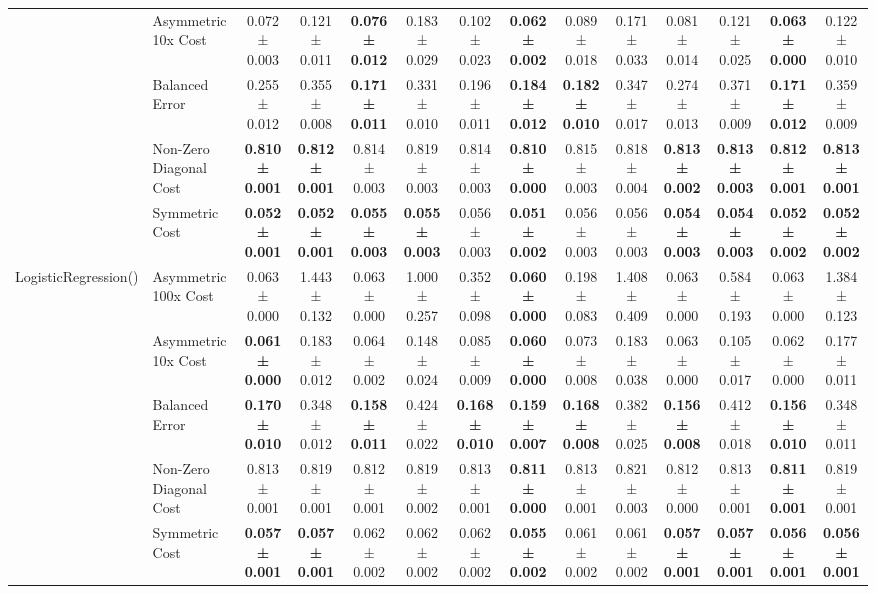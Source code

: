 \begin{table}[H]
{\begin{tabular}{llcccccccccccc}
 & Asymmetric 10x Cost & 0.072 ± 0.003 & 0.121 ± 0.011 & \textbf{0.076 ± 0.012} & 0.183 ± 0.029 & 0.102 ± 0.023 & \textbf{0.062 ± 0.002} & 0.089 ± 0.018 & 0.171 ± 0.033 & 0.081 ± 0.014 & 0.121 ± 0.025 & \textbf{0.063 ± 0.000} & 0.122 ± 0.010 \\
 & Balanced Error & 0.255 ± 0.012 & 0.355 ± 0.008 & \textbf{0.171 ± 0.011} & 0.331 ± 0.010 & 0.196 ± 0.011 & \textbf{0.184 ± 0.012} & \textbf{0.182 ± 0.010} & 0.347 ± 0.017 & 0.274 ± 0.013 & 0.371 ± 0.009 & \textbf{0.171 ± 0.012} & 0.359 ± 0.009 \\
 & Non-Zero Diagonal Cost & \textbf{0.810 ± 0.001} & \textbf{0.812 ± 0.001} & 0.814 ± 0.003 & 0.819 ± 0.003 & 0.814 ± 0.003 & \textbf{0.810 ± 0.000} & 0.815 ± 0.003 & 0.818 ± 0.004 & \textbf{0.813 ± 0.002} & \textbf{0.813 ± 0.003} & \textbf{0.812 ± 0.001} & \textbf{0.813 ± 0.001} \\
 & Symmetric Cost & \textbf{0.052 ± 0.001} & \textbf{0.052 ± 0.001} & \textbf{0.055 ± 0.003} & \textbf{0.055 ± 0.003} & 0.056 ± 0.003 & \textbf{0.051 ± 0.002} & 0.056 ± 0.003 & 0.056 ± 0.003 & \textbf{0.054 ± 0.003} & \textbf{0.054 ± 0.003} & \textbf{0.052 ± 0.002} & \textbf{0.052 ± 0.002} \\
\cline{1-14}
\multirow[t]{5}{*}{LogisticRegression()} & Asymmetric 100x Cost & 0.063 ± 0.000 & 1.443 ± 0.132 & 0.063 ± 0.000 & 1.000 ± 0.257 & 0.352 ± 0.098 & \textbf{0.060 ± 0.000} & 0.198 ± 0.083 & 1.408 ± 0.409 & 0.063 ± 0.000 & 0.584 ± 0.193 & 0.063 ± 0.000 & 1.384 ± 0.123 \\
 & Asymmetric 10x Cost & \textbf{0.061 ± 0.000} & 0.183 ± 0.012 & 0.064 ± 0.002 & 0.148 ± 0.024 & 0.085 ± 0.009 & \textbf{0.060 ± 0.000} & 0.073 ± 0.008 & 0.183 ± 0.038 & 0.063 ± 0.000 & 0.105 ± 0.017 & 0.062 ± 0.000 & 0.177 ± 0.011 \\
 & Balanced Error & \textbf{0.170 ± 0.010} & 0.348 ± 0.012 & \textbf{0.158 ± 0.011} & 0.424 ± 0.022 & \textbf{0.168 ± 0.010} & \textbf{0.159 ± 0.007} & \textbf{0.168 ± 0.008} & 0.382 ± 0.025 & \textbf{0.156 ± 0.008} & 0.412 ± 0.018 & \textbf{0.156 ± 0.010} & 0.348 ± 0.011 \\
 & Non-Zero Diagonal Cost & 0.813 ± 0.001 & 0.819 ± 0.001 & 0.812 ± 0.001 & 0.819 ± 0.002 & 0.813 ± 0.001 & \textbf{0.811 ± 0.000} & 0.813 ± 0.001 & 0.821 ± 0.003 & 0.812 ± 0.000 & 0.813 ± 0.001 & \textbf{0.811 ± 0.001} & 0.819 ± 0.001 \\
 & Symmetric Cost & \textbf{0.057 ± 0.001} & \textbf{0.057 ± 0.001} & 0.062 ± 0.002 & 0.062 ± 0.002 & 0.062 ± 0.002 & \textbf{0.055 ± 0.002} & 0.061 ± 0.002 & 0.061 ± 0.002 & \textbf{0.057 ± 0.001} & \textbf{0.057 ± 0.001} & \textbf{0.056 ± 0.001} & \textbf{0.056 ± 0.001} \\

\end{tabular}}
\end{table}
